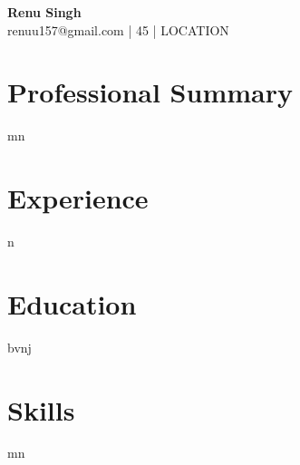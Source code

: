 \documentclass[11pt,a4paper]{article}
\begin{document}
\begin{center}
{\Huge \textbf{Renu Singh}}\\
renuu157@gmail.com | 45 | {{LOCATION}}
\end{center}

\section*{Professional Summary}
mn

\section*{Experience}
n

\section*{Education}
bvnj

\section*{Skills}
mn
\end{document}
